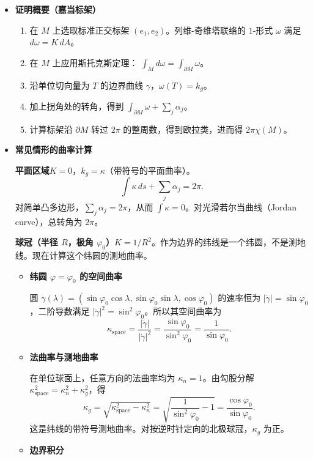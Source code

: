 \begin{itemize}
  \item \textbf{证明概要（嘉当标架）}
  \begin{enumerate}[label=\arabic*.]
    \item 在 $M$ 上选取标准正交标架 $(e_1,e_2)$。列维-奇维塔联络的 $1$-形式 $\omega$ 满足 $d\omega=K\,dA$。
    \item 在 $M$ 上应用斯托克斯定理：
    $\displaystyle\int_M d\omega=\int_{\partial M}\omega$。
    \item 沿单位切向量为 $T$ 的边界曲线 $\gamma$，$\omega(T)=k_g$。
    \item 加上拐角处的转角，得到
    $\displaystyle\int_{\partial M}\omega+\sum_j\alpha_j$。
    \item 计算标架沿 $\partial M$ 转过 $2\pi$ 的整周数，得到欧拉类，进而得 $2\pi\chi(M)$。
  \end{enumerate}
  \item \textbf{常见情形的曲率计算}

  \textbf{平面区域}\quad $K=0$，$k_g=\kappa$（带符号的平面曲率）。
  \[
    \int\kappa\,ds+\sum_j\alpha_j=2\pi.
  \]
  对简单凸多边形，$\sum_j\alpha_j=2\pi$，从而 $\int\kappa=0$。对光滑若尔当曲线（Jordan curve），总转角为 $2\pi$。

  \textbf{球冠（半径 $R$，极角 $\varphi_0$）}\quad $K=1/R^2$。作为边界的纬线是一个纬圆，不是测地线。现在计算这个纬圆的测地曲率。
  \begin{itemize}
    \item \textbf{纬圆 $\varphi=\varphi_0$ 的空间曲率}

    圆 $\gamma(\lambda)=(\sin\varphi_0\cos\lambda,\sin\varphi_0\sin\lambda,\cos\varphi_0)$ 的速率恒为 $\lvert\dot\gamma\rvert=\sin\varphi_0$，二阶导数满足 $\lvert\ddot\gamma\rvert^2=\sin^2\varphi_0$。所以其空间曲率为
    \[
      \kappa_{\mathrm{space}}
        =\frac{\lvert\ddot\gamma\rvert}{\lvert\dot\gamma\rvert^2}
        =\frac{\sin\varphi_0}{\sin^2\varphi_0}=\frac1{\sin\varphi_0}.
    \]
    \item \textbf{法曲率与测地曲率}

    在单位球面上，任意方向的法曲率均为 $\kappa_n=1$。由勾股分解 $\kappa_{\mathrm{space}}^2=\kappa_n^2+\kappa_g^2$，得
    \[
      \kappa_g=\sqrt{\kappa_{\mathrm{space}}^2-\kappa_n^2}
         =\sqrt{\frac1{\sin^2\varphi_0}-1}
         =\frac{\cos\varphi_0}{\sin\varphi_0}.
    \]
    这是纬线的带符号测地曲率。对按逆时针定向的北极球冠，$\kappa_g$ 为正。
    \item \textbf{边界积分}


\end{itemize}
\end{itemize}
